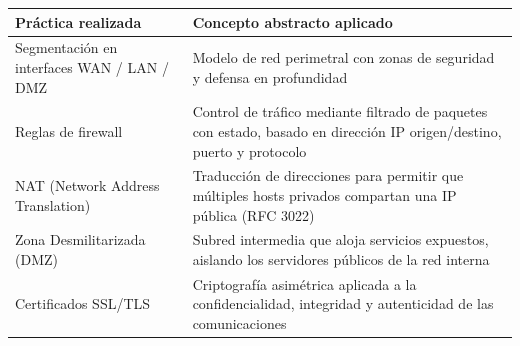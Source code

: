 \documentclass{article}
\renewcommand{\_}{\oldunderscore\hskip0pt\relax}
\begin{document}
\begin{longtable}[]{@{}ll@{}}
\toprule
\begin{minipage}[b]{0.48\columnwidth}\raggedright
Práctica realizada\strut
\end{minipage} & \begin{minipage}[b]{0.48\columnwidth}\raggedright
Concepto abstracto aplicado\strut
\end{minipage}\tabularnewline
\midrule
\endhead
\begin{minipage}[t]{0.48\columnwidth}\raggedright
Segmentación en interfaces WAN / LAN / DMZ\strut
\end{minipage} & \begin{minipage}[t]{0.48\columnwidth}\raggedright
Modelo de red perimetral con zonas de seguridad y defensa en
profundidad\strut
\end{minipage}\tabularnewline
\begin{minipage}[t]{0.48\columnwidth}\raggedright
Reglas de firewall\strut
\end{minipage} & \begin{minipage}[t]{0.48\columnwidth}\raggedright
Control de tráfico mediante filtrado de paquetes con estado, basado en
dirección IP origen/destino, puerto y protocolo\strut
\end{minipage}\tabularnewline
\begin{minipage}[t]{0.48\columnwidth}\raggedright
NAT (Network Address Translation)\strut
\end{minipage} & \begin{minipage}[t]{0.48\columnwidth}\raggedright
Traducción de direcciones para permitir que múltiples hosts privados
compartan una IP pública (RFC 3022)\strut
\end{minipage}\tabularnewline
\begin{minipage}[t]{0.48\columnwidth}\raggedright
Zona Desmilitarizada (DMZ)\strut
\end{minipage} & \begin{minipage}[t]{0.48\columnwidth}\raggedright
Subred intermedia que aloja servicios expuestos, aislando los servidores
públicos de la red interna\strut
\end{minipage}\tabularnewline
\begin{minipage}[t]{0.48\columnwidth}\raggedright
Certificados SSL/TLS\strut
\end{minipage} & \begin{minipage}[t]{0.48\columnwidth}\raggedright
Criptografía asimétrica aplicada a la confidencialidad, integridad y
autenticidad de las comunicaciones\strut

\end{minipage}
\end{longtable}
\end{document}
